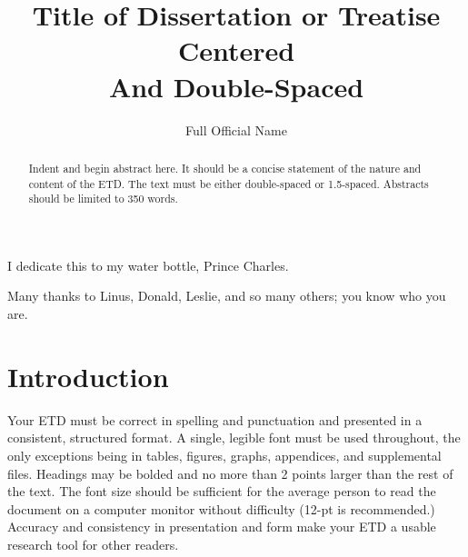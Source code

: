 \documentclass{utexasthesis}
\title{Title of Dissertation or Treatise Centered \\ And Double-Spaced}
\author{Full Official Name}
\begin{document}
\maketitle

\begin{dedication}
  I dedicate this to my water bottle, Prince Charles.
\end{dedication}


\begin{acknowledgments}
  Many thanks to Linus, Donald, Leslie, and so many others; you know who you are.
\end{acknowledgments}

\begin{abstract}
  Indent and begin abstract here. It should be a concise statement of the nature and content of the ETD. The text must be either double-spaced or 1.5-spaced. Abstracts should be limited to 350 words.
\end{abstract}

\maketableofcontents




\chapter{Introduction}

Your ETD must be correct in spelling and punctuation and presented in a consistent, structured format. A single, legible font must be used throughout, the only exceptions being in tables, figures, graphs, appendices, and supplemental files. Headings may be bolded and no more than 2 points larger than the rest of the text. The font size should be sufficient for the average person to read the document on a computer monitor without difficulty (12-pt is recommended.) Accuracy and consistency in presentation and form make your ETD a usable research tool for other readers.
\end{document}
